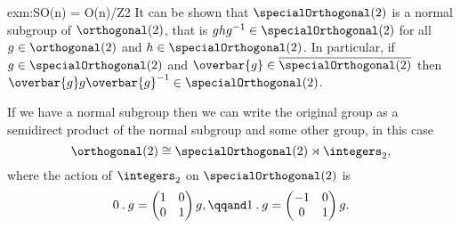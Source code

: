 \documentclass[fleqn]{NotesClass}
\newcommand{\action}{\mathbin{.}}
\newcommand{\isomorphic}{\cong}
\begin{document}
\begin{exm}{}{exm:SO(n) = O(n)/Z2}
        It can be shown that \(\specialOrthogonal(2)\) is a normal subgroup of \(\orthogonal(2)\), that is \(ghg^{-1} \in \specialOrthogonal(2)\) for all \(g \in \orthogonal(2)\) and \(h \in \specialOrthogonal(2)\).
        In particular, if \(g \in \specialOrthogonal(2)\) and \(\overbar{g} \in \overline{\specialOrthogonal(2)}\) then \(\overbar{g} g \overbar{g}^{-1} \in \specialOrthogonal(2)\).
        
        If we have a normal subgroup then we can write the original group as a semidirect product of the normal subgroup and some other group, in this case
        \begin{equation}
            \orthogonal(2) \isomorphic \specialOrthogonal(2) \rtimes \integers_2,
        \end{equation}
        where the action of \(\integers_2\) on \(\specialOrthogonal(2)\) is
        \begin{equation}
            0 \action g =
            \begin{pmatrix}
                1 & 0\\
                0 & 1
            \end{pmatrix}
            g, \qqand 1 \action g = 
            \begin{pmatrix}
                -1 & 0\\
                0 & 1
            \end{pmatrix}
            g.
        \end{equation}
    \end{exm}
    
\end{document}
